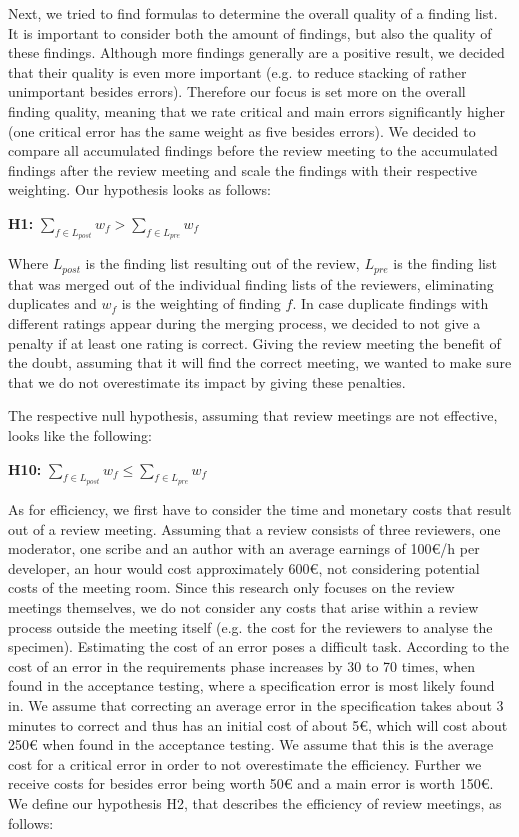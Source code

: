 Next, we tried to find formulas to determine the overall quality of a finding list. It is important to consider both the amount of findings, but also the quality of these findings. Although more findings generally are a positive result, we decided that their quality is even more important (e.g. to reduce stacking of rather unimportant besides errors). Therefore our focus is set more on the overall finding quality, meaning that we rate critical and main errors significantly higher (one critical error has the same weight as five besides errors).
We decided to compare all accumulated findings before the review meeting to the accumulated findings after the review meeting and scale the findings with their respective weighting.
Our hypothesis looks as follows:

\begin{center}
	\textbf{H1:} $\sum_{f \in L_{post}} w_f > \sum_{f \in L_{pre}} w_f$
\end{center}

Where $L_{post}$ is the finding list resulting out of the review, $L_{pre}$ is the finding list that was merged out of the individual finding lists of the reviewers, eliminating duplicates and $w_f$ is the weighting of finding $f$. 
In case duplicate findings with different ratings appear during the merging process, we decided to not give a penalty if at least one rating is correct. Giving the review meeting the benefit of the doubt, assuming that it will find the correct meeting, we wanted to make sure that we do not overestimate its impact by giving these penalties.

The respective null hypothesis, assuming that review meetings are not effective, looks like the following:

\begin{center}
	\textbf{H10:} $\sum_{f \in L_{post}} w_f \le \sum_{f \in L_{pre}} w_f$
\end{center}

As for efficiency, we first have to consider the time and monetary costs that result out of a review meeting. Assuming that a review consists of three reviewers, one moderator, one scribe and an author with an average earnings of 100€/h per developer, an hour would cost approximately 600€, not considering potential costs of the meeting room. Since this research only focuses on the review meetings themselves, we do not consider any costs that arise within a review process outside the meeting itself (e.g. the cost for the reviewers to analyse the specimen). Estimating the cost of an error poses a difficult task. According to \cite{stecklein2004error} the cost of an error in the requirements phase increases by 30 to 70 times, when found in the acceptance testing, where a specification error is most likely found in. We assume that correcting an average error in the specification takes about 3 minutes to correct and thus has an initial cost of about 5€, which will cost about 250€ when found in the acceptance testing.
We assume that this is the average cost for a critical error in order to not overestimate the efficiency. Further we receive costs for besides error being worth 50€ and a main error is worth 150€. We define our hypothesis H2, that describes the efficiency of review meetings, as follows:

